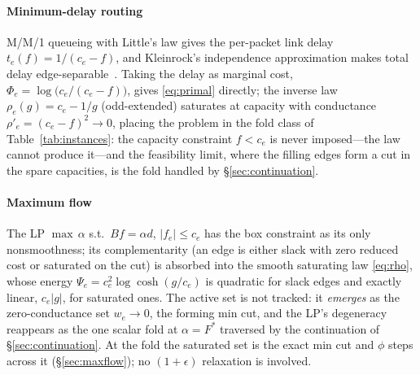 \documentclass{siamart220329}
\begin{document}
\paragraph{Minimum-delay routing} M/M/1 queueing with Little's law gives the per-packet link
delay $t_e(f)=1/(c_e-f)$, and Kleinrock's independence approximation makes total delay
edge-separable~\cite{bertsekas-gallager}. Taking the delay as marginal cost,
$\Phi_e=\log\!\big(c_e/(c_e-f)\big)$, gives \eqref{eq:primal} directly; the inverse law
$\rho_e(g)=c_e-1/g$ (odd-extended) saturates at capacity with conductance
$\rho'_e=(c_e-f)^2\to0$, placing the problem in the fold class of Table~\ref{tab:instances}: the
capacity constraint $f<c_e$ is never imposed---the law cannot produce it---and the feasibility
limit, where the filling edges form a cut in the spare capacities, is the fold handled by
\S\ref{sec:continuation}.

\paragraph{Maximum flow} The LP $\max\,\alpha$ s.t.\ $Bf=\alpha d$, $|f_e|\le c_e$ has the box
constraint as its only nonsmoothness; its complementarity (an edge is either slack with zero
reduced cost or saturated on the cut) is absorbed into the smooth saturating law \eqref{eq:rho},
whose energy $\Psi_e=c_e^2\log\cosh(g/c_e)$ is quadratic for slack edges and exactly linear,
$c_e|g|$, for saturated ones. The active set is not tracked: it \emph{emerges} as the
zero-conductance set $w_e\to0$, the forming min cut, and the LP's degeneracy reappears as the one
scalar fold at $\alpha=F^{*}$ traversed by the continuation of \S\ref{sec:continuation}. At the
fold the saturated set is the exact min cut and $\phi$ steps across it (\S\ref{sec:maxflow}); no
$(1+\epsilon)$ relaxation is involved.
\end{document}
